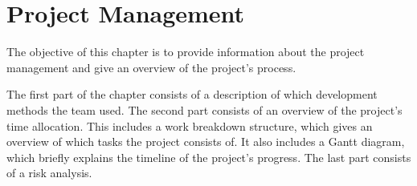 \chapter{Project Management}

The objective of this chapter is to provide information about the project management and give an overview of the project's process. 

The first part of the chapter consists of a description of which development methods the team used. The second part consists of an overview of the project's time allocation. This includes a work breakdown structure, which gives an overview of which tasks the project consists of. It also includes a Gantt diagram, which briefly explains the timeline of the project's progress. The last part consists of a risk analysis.







